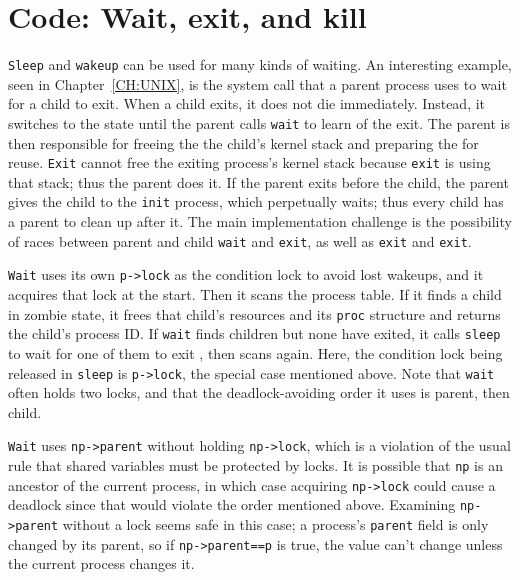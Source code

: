 \section{Code: Wait, exit, and kill}
\lstinline{Sleep}
and
\lstinline{wakeup}
can be used for many kinds of waiting.
An interesting example, seen in Chapter~\ref{CH:UNIX},
is the
system call that a parent process uses to wait for a child to exit.
When a child exits, it does not die immediately.
Instead, it switches to the
state until the parent calls
\lstinline{wait}
to learn of the exit.
The parent is then responsible for freeing the
the child's kernel stack
and preparing the
for reuse.
\lstinline{Exit} cannot free the exiting process's
kernel stack because \lstinline{exit} is using
that stack; thus the parent does it.
If the parent exits before the child, the 
parent gives the child to the
\lstinline{init}
process, which perpetually waits;
thus
every child has a parent to clean up after it.
The main implementation challenge is
the possibility of races between
parent and child
\lstinline{wait}
and
\lstinline{exit},
as well as
\lstinline{exit}
and
\lstinline{exit}.

\lstinline{Wait}
uses its own
\lstinline{p->lock}
as the condition lock to avoid lost wakeups,
and it acquires that lock at the start.
Then it scans the process table.
If it finds a child in zombie state,
it frees that child's resources and
its \lstinline{proc} structure and returns the child's process ID.
If 
\lstinline{wait}
finds children but none have exited,
it calls
\lstinline{sleep}
to wait for one of them to exit
,
then scans again.
Here,
the condition lock being released in 
\lstinline{sleep}
is \lstinline{p->lock},
the special case mentioned above.
Note that \lstinline{wait} often holds two locks,
and that the deadlock-avoiding order it uses is
parent, then child.

\lstinline{Wait} uses \lstinline{np->parent} without holding
\lstinline{np->lock}, which is a violation of the usual rule that
shared variables must be protected by locks. It is possible that
\lstinline{np} is an ancestor of the current process, in which case
acquiring \lstinline{np->lock} could cause a deadlock since that would
violate the order mentioned above. Examining \lstinline{np->parent}
without a lock seems safe in this case; a process's \lstinline{parent}
field is only changed by its parent, so if \lstinline{np->parent==p}
is true, the value can't change unless the current process changes it.

